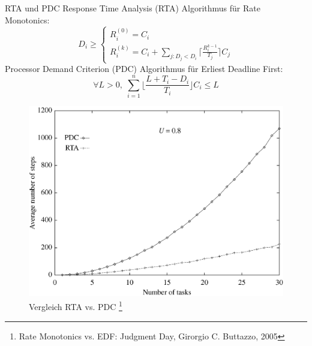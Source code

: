 \begin{frame}

\end{frame}

\begin{frame}{RTA und PDC}
	Response Time Analysis (RTA) Algorithmus für Rate Monotonics:
	\begin{equation}
		D_i \geq
		\begin{cases}
   				R_i^{(0)}=C_i \\
   				R_i^{(k)}=C_i+ \sum_{j:D_j<D_i} \lceil \frac{R_i^{k-1}}{T_j}\rceil C_j
  		\end{cases}
	\end{equation}
	Processor Demand Criterion (PDC) Algorithmus für Erliest Deadline First:
	\begin{equation}
		\forall L > 0,\; \sum_{i=1}^n\lfloor \frac{L+T_i-D_i}{T_i}\rfloor C_i \leq L
	\end{equation}

	\begin{figure}[htbp]
		\begin{center}	
			\includegraphics[scale=.30]{graphics/vergleich/rtapdc.png}
		\end{center}
		\caption{Vergleich RTA vs. PDC \footnote{Rate Monotonics vs. EDF: Judgment Day, Girorgio C. Buttazzo, 2005}}	
		\label{fig:RTAvsPDC}
	\end{figure}
\end{frame}

